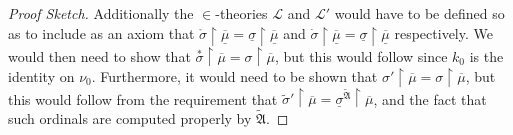 \documentclass{amsart}
\theoremstyle{definition}
\theoremstyle{remark}
\newcommand{\rest}{\mathbin{\upharpoonright}}
\begin{document}
\begin{proof}[Proof Sketch]
Additionally the $\in$-theories $\mathcal L$ and $\mathcal L'$ would have to be defined so as to include as an axiom that $\mathring \sigma \rest \overline{\underline{\mu}} = \underline{\sigma} \rest \overline{\underline \mu}$ and $\dot \sigma \rest \overline{\underline{\mu}} = \underline{\sigma} \rest \overline{\underline \mu}$ respectively. 
We would then need to show that $\overset{*}\sigma \rest \overline{\mu} = \sigma \rest \overline{\mu}$, but this would follow since $k_0$ is the identity on $\nu_0$. 
Furthermore, it would need to be shown that $\sigma' \rest \overline{\mu} = \sigma \rest \overline{\mu}$, but this would follow from the requirement that $\widetilde \sigma' \rest \overline{\mu} = \underline{\sigma}^{\widetilde{\mathfrak A}} \rest \overline{\mu}$, and the fact that such ordinals are computed properly by $\widetilde{\mathfrak A}$. 
\end{proof}




\end{document}

